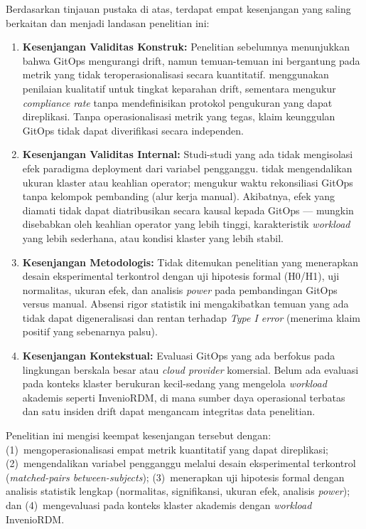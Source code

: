 Berdasarkan tinjauan pustaka di atas, terdapat empat kesenjangan yang saling berkaitan dan menjadi landasan penelitian ini:

\begin{enumerate}
  \item \textbf{Kesenjangan Validitas Konstruk:} Penelitian sebelumnya menunjukkan bahwa GitOps mengurangi drift, namun temuan-temuan ini bergantung pada metrik yang tidak teroperasionalisasi secara kuantitatif. \citet{shrestha2024configuration} menggunakan penilaian kualitatif untuk tingkat keparahan drift, sementara \citet{kaggantinataraja2025security} mengukur \textit{compliance rate} tanpa mendefinisikan protokol pengukuran yang dapat direplikasi. Tanpa operasionalisasi metrik yang tegas, klaim keunggulan GitOps tidak dapat diverifikasi secara independen.

  \item \textbf{Kesenjangan Validitas Internal:} Studi-studi yang ada tidak mengisolasi efek paradigma deployment dari variabel pengganggu. \citet{kaggantinataraja2025security} tidak mengendalikan ukuran klaster atau keahlian operator; \citet{matubber2025managing} mengukur waktu rekonsiliasi GitOps tanpa kelompok pembanding (alur kerja manual). Akibatnya, efek yang diamati tidak dapat diatribusikan secara kausal kepada GitOps --- mungkin disebabkan oleh keahlian operator yang lebih tinggi, karakteristik \textit{workload} yang lebih sederhana, atau kondisi klaster yang lebih stabil.

  \item \textbf{Kesenjangan Metodologis:} Tidak ditemukan penelitian yang menerapkan desain eksperimental terkontrol dengan uji hipotesis formal (H0/H1), uji normalitas, ukuran efek, dan analisis \textit{power} pada pembandingan GitOps versus manual. Absensi rigor statistik ini mengakibatkan temuan yang ada tidak dapat digeneralisasi dan rentan terhadap \textit{Type I error} (menerima klaim positif yang sebenarnya palsu).

  \item \textbf{Kesenjangan Kontekstual:} Evaluasi GitOps yang ada berfokus pada lingkungan berskala besar atau \textit{cloud provider} komersial. Belum ada evaluasi pada konteks klaster berukuran kecil-sedang yang mengelola \textit{workload} akademis seperti InvenioRDM, di mana sumber daya operasional terbatas dan satu insiden drift dapat mengancam integritas data penelitian.
\end{enumerate}

Penelitian ini mengisi keempat kesenjangan tersebut dengan: (1)~mengoperasionalisasi empat metrik kuantitatif yang dapat direplikasi; (2)~mengendalikan variabel pengganggu melalui desain eksperimental terkontrol (\textit{matched-pairs between-subjects}); (3)~menerapkan uji hipotesis formal dengan analisis statistik lengkap (normalitas, signifikansi, ukuran efek, analisis \textit{power}); dan (4)~mengevaluasi pada konteks klaster akademis dengan \textit{workload} InvenioRDM.